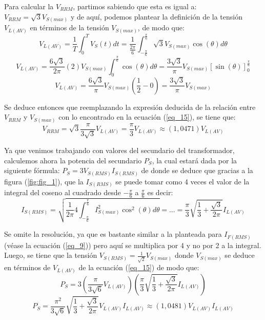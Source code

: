 \documentclass[12pt,a4paper]{article}
\begin{document}
Para calcular la $V_{RRM}$, partimos sabiendo que esta es igual a: $V_{RRM} = \sqrt{3} V_{S(max)}$ y de aquí, podemos plantear la definición de la tensión $V_{L(AV)}$ en términos de la tensión $V_{S(max)}$, de modo que:
\begin{equation}
    V_{L(AV)} = \frac{1}{T} \int_{0}^{T} V_S(t) dt = \frac{1}{\frac{2\pi}{6}} \int_{-\frac{\pi}{6}}^{\frac{\pi}{6}} \sqrt{3} V_{S(max)} \cos(\theta) d\theta
    \label{eq_13}
\end{equation}
\begin{equation}
    V_{L(AV)} = \frac{6\sqrt{3}}{2\pi} (2) V_{S(max)} \int_{0}^{\frac{\pi}{6}} \cos(\theta) d\theta = \frac{3\sqrt{3}}{\pi} V_{S(max)} \left[\sin(\theta)\right]_{0}^{\frac{\pi}{6}}
    \label{eq_14}
\end{equation}
\begin{equation}
    V_{L(AV)} = \frac{6\sqrt{3}}{\pi} V_{S(max)} \left(\frac{1}{2}-0\right) = \frac{3\sqrt{3}}{\pi} V_{S(max)}
    \label{eq_15}
\end{equation}

Se deduce entonces que reemplazando la expresión deducida de la relación entre $V_{RRM}$ y $V_{S(max)}$ con lo encontrado en la ecuación (\ref{eq_15}), se tiene que:
\begin{equation}
    V_{RRM} = \sqrt{3} \frac{\pi}{3\sqrt{3}} V_{L(AV)} = \frac{\pi}{3} V_{L(AV)} \approx (1,0471)V_{L(AV)}
    \label{eq_16}
\end{equation}

Ya que venimos trabajando con valores del secundario del transformador, calculemos ahora la potencia del secundario $P_{S}$, la cual estará dada por la siguiente fórmula: $P_{S} = 3 V_{S(RMS)} I_{S(RMS)}$ de donde se deduce que gracias a la figura (\ref{fig:fig_1}), que la $I_{S(RMS)}$ se puede tomar como 4 veces el valor de la integral del coseno al cuadrado desde $-\frac{\pi}{6}$ a $\frac{\pi}{6}$ es decir:
\begin{equation}
    I_{S(RMS)} = \sqrt{\frac{1}{2\pi} 4 \int_{-\frac{\pi}{6}}^{\frac{\pi}{6}} I^{2}_{S(max)} \cos^{2}(\theta) d\theta} = ... = \frac{\pi}{3} \sqrt{\frac{1}{3} + \frac{\sqrt{3}}{2\pi}} I_{L(AV)}
    \label{eq_17}
\end{equation}

Se omite la resolución, ya que es bastante similar a la planteada para $I_{F(RMS)}$ (véase la ecuación (\ref{eq_9})) pero aquí se multiplica por 4 y no por 2 a la integral. Luego, se tiene que la tensión $V_{S(RMS)} = \frac{1}{\sqrt{2}} V_{S(max)}$ donde $V_{S(max)}$ se deduce en términos de $V_{L(AV)}$ de la ecuación (\ref{eq_15}) de modo que:
\begin{equation}
    P_{S} = 3 \left(\frac{\pi}{3\sqrt{6}} V_{L(AV)}\right) \left(\frac{\pi}{3} \sqrt{\frac{1}{3} + \frac{\sqrt{3}}{2\pi}} I_{L(AV)}\right)
    \label{eq_18}
\end{equation}
\begin{equation}
    P_{S} = \frac{\pi^2}{3\sqrt{6}}\sqrt{\frac{1}{3} + \frac{\sqrt{3}}{2\pi}} V_{L(AV)} I_{L(AV)} \approx (1,0481) V_{L(AV)} I_{L(AV)}
    \label{eq_19}
\end{equation}
\end{document}
